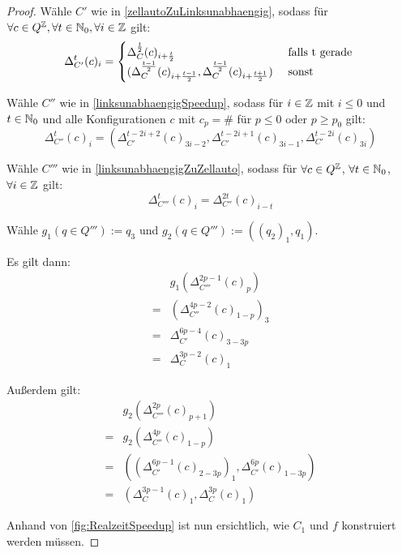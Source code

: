 \begin{proof}
    Wähle $C'$ wie in \cref{zellautoZuLinksunabhaengig}, sodass
    für $\forall c \in Q^{\mathbb{Z}}, \forall t \in \mathbb{N}_0, \forall i \in \mathbb{Z}$ gilt:
    \[
        \Delta_{C'}^{t}(c)_i =
        \begin{cases}
            \Delta_C^{\frac{t}{2}}(c)_{i+\frac{t}{2}} & \text{ falls } $t$ \text{ gerade } \\
            (\Delta_C^{\frac{t - 1}{2}}(c)_{i+\frac{t - 1}{2}}, \Delta_C^{\frac{t-1}{2}}(c)_{i+\frac{t+1}{2}})  & \text{ sonst}
        \end{cases}
    \]
    
    Wähle $C''$ wie in \cref{linksunabhaengigSpeedup}, sodass für $i \in \mathbb{Z}$ mit $i \leq 0$ und $t \in \mathbb{N}_0$
    und alle Konfigurationen $c$ mit $c_p = \#$ für $p \leq 0$ oder $p \geq p_0$ gilt:
    \[
        \Delta^{t}_{C''}(c)_i = ( \Delta^{t-2i+2}_{C'}(c)_{3i-2},
        \Delta^{t-2i+1}_{C'}(c)_{3i-1},
        \Delta^{t-2i}_{C'}(c)_{3i}
        )
    \]
    
    Wähle $C'''$ wie in \cref{linksunabhaengigZuZellauto}, sodass für $\forall c \in Q^{\mathbb{Z}}$,
    $\forall t \in \mathbb{N}_0$, $\forall i \in \mathbb{Z}$ gilt:
    \[
        \Delta^t_{C'''}(c)_{i} = \Delta^{2t}_{C''}(c)_{i-t}
    \]
    
    Wähle $g_1(q \in Q''') := q_3$ und $g_2(q \in Q''') := ((q_2)_1, q_1)$.
    
    Es gilt dann:
    \begin{align*}
          & g_1(\Delta_{C'''}^{2p-1}(c)_p) \\
        = & (\Delta_{C''}^{4p-2}(c)_{1-p})_3 \\
        = & \Delta_{C'}^{6p-4}(c)_{3-3p} \\
        = & \Delta_{C}^{3p-2}(c)_1
    \end{align*}
    
    Außerdem gilt:
    \begin{align*}
          & g_2(\Delta_{C'''}^{2p}(c)_{p+1}) \\
        = & g_2(\Delta_{C''}^{4p}(c)_{1-p}) \\
        = & ((\Delta_{C'}^{6p-1}(c)_{2-3p})_1, \Delta_{C'}^{6p}(c)_{1-3p}) \\
        = & (\Delta_C^{3p-1}(c)_1, \Delta_C^{3p}(c)_1)
    \end{align*}

    Anhand von \cref{fig:RealzeitSpeedup} ist nun ersichtlich, wie $C_1$ und $f$ konstruiert werden müssen.
\end{proof}






